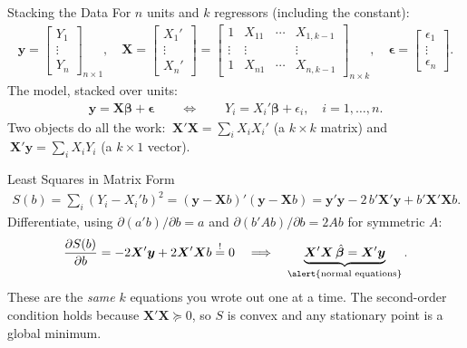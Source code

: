 \documentclass[aspectratio=169,11pt,xcolor=dvipsnames]{beamer}
\newcommand{\X}{\bm{X}}
\newcommand{\Y}{\bm{y}}
\newcommand{\bhat}{\hat{\bm{\beta}}}
\begin{document}
\begin{frame}{Stacking the Data}
For $n$ units and $k$ regressors (including the constant):
\begin{align*}
  \Y = \begin{bmatrix} Y_1 \\ \vdots \\ Y_n \end{bmatrix}_{n\times 1},
  \quad
  \X = \begin{bmatrix} X_1' \\ \vdots \\ X_n' \end{bmatrix}
     = \begin{bmatrix}
        1 & X_{11} & \cdots & X_{1,k-1}\\
        \vdots & \vdots & & \vdots \\
        1 & X_{n1} & \cdots & X_{n,k-1}
       \end{bmatrix}_{n\times k},
  \quad
  \bm\epsilon = \begin{bmatrix} \epsilon_1 \\ \vdots \\ \epsilon_n\end{bmatrix}.
\end{align*}
The model, stacked over units:
\begin{align*}
  \Y = \X\bm\beta + \bm\epsilon
  \qquad\Longleftrightarrow\qquad
  Y_i = X_i'\bm\beta + \epsilon_i,\quad i=1,\dots,n .
\end{align*}
Two objects do all the work:
$\ \X'\X = \sum_i X_iX_i'$ (a $k\times k$ matrix) and
$\ \X'\Y = \sum_i X_i Y_i$ (a $k\times 1$ vector).
\end{frame}

\begin{frame}{Least Squares in Matrix Form}
\begin{align*}
  S(b) = \sum_{i} (Y_i - X_i'b)^2 = (\Y-\X b)'(\Y-\X b)
       = \Y'\Y - 2\,b'\X'\Y + b'\X'\X b .
\end{align*}
\pause
Differentiate, using $\partial (a'b)/\partial b = a$ and
$\partial (b'Ab)/\partial b = 2Ab$ for symmetric $A$:
\begin{align*}
  \frac{\partial S(b)}{\partial b} = -2\X'\Y + 2\X'\X b \overset{!}{=} 0
  \quad\Longrightarrow\quad
  \underbrace{\X'\X\,\bhat = \X'\Y}_{\text{\alert{normal equations}}} .
\end{align*}
\pause
These are the \emph{same} $k$ equations you wrote out one at a time. The
second-order condition holds because $\X'\X \succeq 0$, so $S$ is convex and any
stationary point is a global minimum.
\end{frame}
\end{document}
